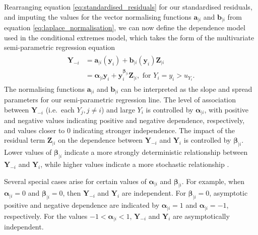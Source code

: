 \documentclass{article}
\numberwithin{equation}{section}
\begin{document}
Rearranging equation \ref{eq:standardised_residuals} for our standardised residuals, and imputing the values for the vector normalising functions $\bm{a}_{\mid i}$ and $\bm{b}_{\mid i}$ from equation \ref{eq:laplace_normalisation}, we can now define the dependence model used in the conditional extremes model, which takes the form of the multivariate semi-parametric regression equation
\begin{align} \label{eq:ce_model}
  \begin{split}
    \bm{Y}_{-i} &= \bm{a}_{\mid i}(\bm{y}_i) + \bm{b}_{\mid i}(\bm{y}_i)\bm{Z}_{\mid i} \\
                &= \bm{\alpha}_{\mid i}\bm{y}_i + \bm{y}_i^{\bm{\beta}_{\mid i}}\bm{Z}_{\mid i}, \text{ for } Y_i = y_i > u_{Y_i}.
  \end{split}
\end{align}
The normalising functions $\bm{a}_{\mid i}$ and $\bm{b}_{\mid i}$ can be interpreted as the slope and spread parameters for our semi-parametric regression line.
The level of association between $\bm{Y}_{-i}$ (i.e.\ each $Y_j, j \ne i$) and large $Y_i$ is controlled by $\bm{\alpha}_{\mid i}$, with positive and negative values indicating positive and negative dependence, respectively, and values closer to 0 indicating stronger independence.
The impact of the residual term $\bm{Z}_{\mid i}$ on the dependence between $\bm{Y}_{-i}$ and $\bm{Y}_i$ is controlled by $\bm{\beta}_{\mid i}$.
Lower values of $\bm{\beta}_{\mid i}$ indicate a more strongly deterministic relationship between $\bm{Y}_{-i}$ and $\bm{Y}_i$, while higher values indicate a more stochastic relationship \citep{Winter2016}.

Several special cases arise for certain values of $\bm{\alpha}_{\mid i}$ and $\bm{\beta}_{\mid i}$.
For example, when $\bm{\alpha}_{\mid i} = 0$ and $\bm{\beta}_{\mid i} = 0$, then $\bm{Y}_{-i}$ and $\bm{Y}_i$ are independent.
For $\bm{\beta}_{\mid i} = 0$, asymptotic positive and negative dependence are indicated by $\bm{\alpha}_{\mid i} = 1$ and $\bm{\alpha}_{\mid i} = -1$, respectively.
For the values $-1 < \bm{\alpha}_{\mid i} < 1$, $\bm{Y}_{-i}$ and $\bm{Y}_i$ are asymptotically independent.

\end{document}
